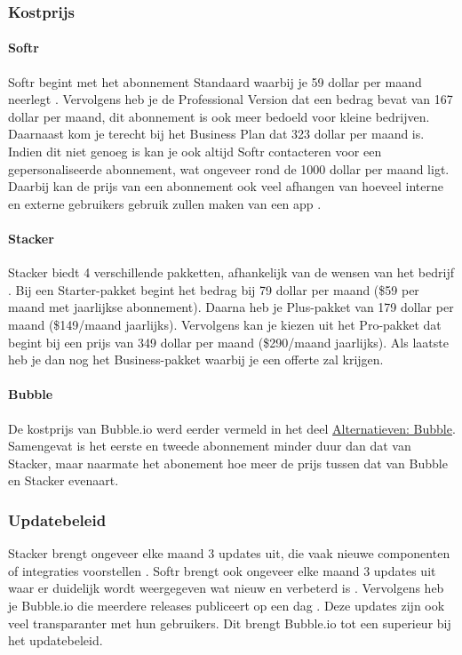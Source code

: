 \subsubsection*{Kostprijs}

\paragraph{Softr}
Softr begint met het abonnement Standaard waarbij je 59 dollar per maand neerlegt \autocite{Frater2024}
\autocite{Youssef2023}. Vervolgens heb je de Professional Version dat een bedrag bevat van 167 dollar per maand, 
dit abonnement is ook meer bedoeld voor kleine bedrijven. Daarnaast kom je terecht bij het Business Plan dat 323 dollar per maand is. 
Indien dit niet genoeg is kan je ook altijd Softr contacteren voor een gepersonaliseerde abonnement, wat ongeveer rond de 1000 dollar per maand ligt. 
Daarbij kan de prijs van een abonnement ook veel afhangen van hoeveel interne en externe gebruikers gebruik zullen maken van een app \autocite{Frater2024}.
\paragraph{Stacker}
Stacker biedt 4 verschillende pakketten, afhankelijk van de wensen van het bedrijf \autocite{JDN2023}
\autocite{Advice}. 
Bij een Starter-pakket begint het bedrag bij 79 dollar per maand (\$59 per maand met jaarlijkse abonnement).  
Daarna heb je Plus-pakket van 179 dollar per maand (\$149/maand jaarlijks). Vervolgens kan je kiezen uit het Pro-pakket 
dat begint bij een prijs van 349 dollar per maand (\$290/maand jaarlijks). Als laatste heb je dan nog het Business-pakket waarbij je een offerte zal krijgen.

\paragraph{Bubble}
De kostprijs van Bubble.io werd eerder vermeld in het deel \hyperref[subsec:alternatieve-platformen]{Alternatieven: Bubble}. 
Samengevat is het eerste en tweede abonnement minder duur dan dat van Stacker, maar naarmate het abonement hoe meer de prijs tussen dat van Bubble en Stacker evenaart.
\subsubsection*{Updatebeleid}
Stacker brengt ongeveer elke maand 3 updates uit, die vaak nieuwe componenten of integraties voorstellen \autocite{Stacker}.  
Softr brengt ook ongeveer elke maand 3 updates uit waar er duidelijk wordt weergegeven wat nieuw en verbeterd is \autocite{Softra}. 
Vervolgens heb je Bubble.io die meerdere releases publiceert op een dag \autocite{Bubble}. Deze updates zijn ook veel transparanter met hun gebruikers. 
Dit brengt Bubble.io tot een superieur bij het updatebeleid.


